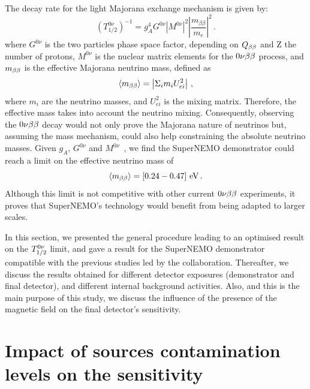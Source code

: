 The decay rate for the light Majorana exchange mechanism is given by:
\begin{equation}
  (T_{1/2}^{0\nu})^{-1} = g_{A}^{4}G^{0\nu}|M^{0\nu}|^{2}\left\lvert\dfrac{m_{\beta\beta}}{m_{e}}\right\rvert^{2}\,.
\end{equation}
where $G^{0\nu}$ is the two particles phase space factor, depending on $Q_{\beta\beta}$ and Z the number of protons, $M^{0\nu}$ is the nuclear matrix elements for the $0\nu\beta\beta$ process, and $m_{\beta\beta}$ is the effective Majorana neutrino mass, defined as
\begin{equation}
  \langle m_{\beta\beta} \rangle = \left\vert \Sigma_{i}m_{i}U^{2}_{ei} \right\vert \,,
\end{equation}
where $m_{i}$ are the neutrino masses, and $U^{2}_{ei}$ is the mixing matrix.
Therefore, the effective mass takes into account the neutrino mixing.
Consequently, observing the $0\nu\beta\beta$ decay would not only prove the Majorana nature of neutrinos but, assuming the mass mechanism, could also help constraining the absolute neutrino masses.
Given $g_{A}$, $G^{0\nu}$ and $M^{0\nu}$~\cite{PhysRevC.85.034316}\cite{MENENDEZ2009139}\cite{PhysRevLett.116.112502}\cite{PhysRevC.91.034304}\cite{PhysRevC.91.024613}\cite{PhysRevC.87.045501}\cite{PhysRevLett.111.142501}\cite{PhysRevC.91.024316}\cite{PhysRevC.82.064310}\cite{PhysRevC.83.034320}, we find the SuperNEMO demonstrator could reach a limit on the effective neutrino mass of
\begin{equation}
\langle m_{\beta\beta}\rangle = [0.24-0.47]~\text{eV}\,.
\end{equation}
Although this limit is not competitive with other current $0\nu\beta\beta$ experiments, it proves that SuperNEMO's technology would benefit from being adapted to larger scales.

In this section, we presented the general procedure leading to an optimised result on the $T_{1/2}^{0\nu}$ limit, and gave a result for the SuperNEMO demonstrator compatible with the previous studies led by the collaboration.
Thereafter, we discuss the results obtained for different detector exposures (demonstrator and final detector), and different internal background activities.
Also, and this is the main purpose of this study, we discuss the influence of the presence of the magnetic field on the final detector's sensitivity.


\section{Impact of sources contamination levels on the sensitivity}
\label{sec:demonstrator_sensitivity}

